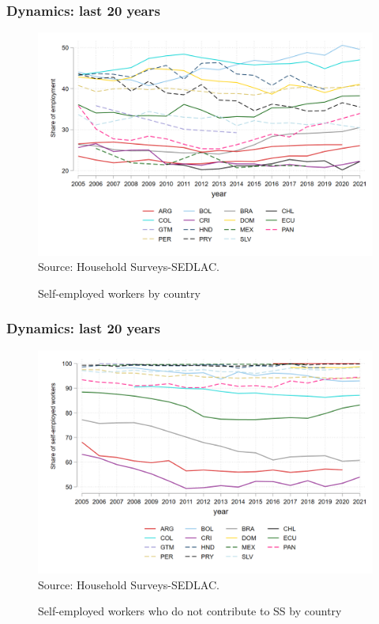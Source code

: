 \documentclass{beamer}
\begin{document}
\begin{frame}
\frametitle{Dynamics: last 20 years}
\begin{figure}[!htb]
        \justifying
        \caption{Self-employed workers by country}     
        \includegraphics[width=0.8\linewidth]{latex/figures/Evolution/self_employed_all.png}
        \label{fig:Evolution_selfemployed}
        \centering
        \footnotesize{Source: Household Surveys-SEDLAC.}
 \end{figure}
 \end{frame}
\begin{frame}
\frametitle{Dynamics: last 20 years}
\begin{figure}[!htb]
        \justifying
        \caption{Self-employed workers who do not contribute to SS by country}     
        \includegraphics[width=0.8\linewidth]{latex/figures/Evolution/iss_sfemployed_all.png}
        \label{fig:Evolution_selfemployedSS}
        \centering
        \footnotesize{Source: Household Surveys-SEDLAC.}
 \end{figure}
 \end{frame}
\end{document}

